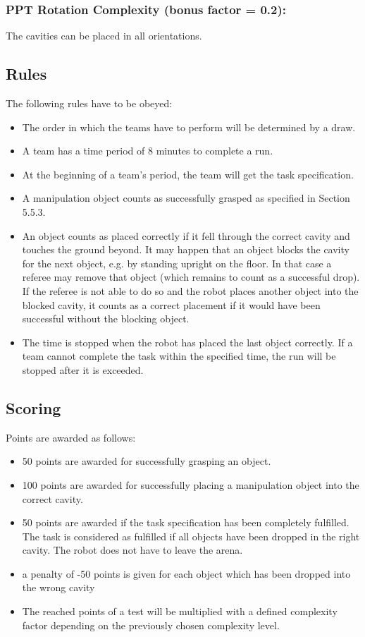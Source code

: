 \subsubsection{PPT Rotation Complexity (bonus factor = 0.2):}
The cavities can be placed in all orientations.

\subsection{Rules}
The following rules have to be obeyed:

\begin{itemize}

\item The order in which the teams have to perform will be determined by a draw.
\item A team has a time period of 8 minutes to complete a run.
\item At the beginning of a team’s period, the team will get the task specification. 
\item A manipulation object counts as successfully grasped as specified in Section 5.5.3.
\item An object counts as placed correctly if it fell through the correct cavity and touches the ground beyond. It may happen that an object blocks the cavity for the next object, e.g. by standing upright on the floor. In that case a referee may remove that object (which remains to count as a successful drop). If the referee is not able to do so and the robot places another object into the blocked cavity, it counts as a correct placement if it would have been successful without the blocking object.
\item The time is stopped when the robot has placed the last object correctly. If a team cannot complete the task within the specified time, the run will be stopped after it is exceeded.  

\end{itemize}

\subsection{Scoring}
Points are awarded as follows:

\begin{itemize}
\item 50 points are awarded for successfully grasping an object.
\item 100 points are awarded for successfully placing a manipulation object into the correct cavity.
\item 50 points are awarded if the task specification has been completely fulfilled. The task is considered as fulfilled if all objects have been dropped in the right cavity. The robot does not have to leave the arena.
\item a penalty of -50 points is given for each object which has been dropped into the wrong cavity
\item The reached points of a test will be multiplied with a defined complexity factor depending on the previously chosen complexity level.
\end{itemize}


